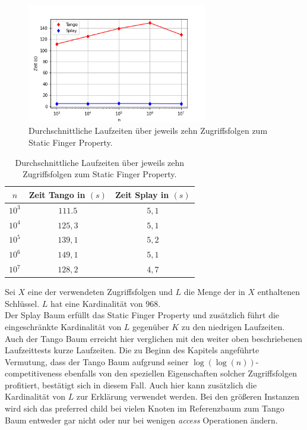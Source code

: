 \documentclass[a4paper,12pt]{article}
\begin{document}
\begin{figure}[H]
	\centering
	\includegraphics[width=0.7\textwidth]{Medien/laufzeittest/diagramm/staticfinger3}
	\caption{Durchschnittliche Laufzeiten über jeweils zehn Zugriffsfolgen zum Static Finger Property.}
\end{figure}
\begin{table}[H]
	\begin{center}
		\begin{tabular}[c]{|c|c|c|}
			\hline
		$n$ & Zeit Tango in $\left(s\right)$ &Zeit Splay in $\left(s\right)$ \\
		\hline
		$10^3$ & $111.5$ &$5,1$ \\
		\hline
		$10^4$  & $125,3$ &$5,1$  \\
		\hline
		$10^5$  & $139,1$ &  $5,2$  \\
		\hline
		$10^6$  & $149,1$ &$5,1$  \\
		\hline
		$10^7$  & $128,2$ &$4,7$  \\
		\hline
		\end{tabular}
		\caption{Durchschnittliche Laufzeiten über jeweils zehn Zugriffsfolgen zum Static Finger Property.} 
	\end{center}
\end{table}
\noindent Sei $X$ eine der verwendeten Zugriffsfolgen und $L$ die Menge der in $X$ enthaltenen Schlüssel. $L$ hat eine Kardinalität von $968$. \\
Der Splay Baum erfüllt das Static Finger Property und zusätzlich führt die eingeschränkte Kardinalität von  $L$ gegenüber $K$ zu den niedrigen Laufzeiten.     
Auch der Tango Baum erreicht hier verglichen mit den weiter oben beschriebenen Laufzeittests kurze Laufzeiten. Die zu Beginn des Kapitels angeführte Vermutung, dass der Tango Baum aufgrund seiner $\log\left(\log\left(n\right)\right)$-competitiveness ebenfalls von den speziellen Eigenschaften solcher Zugriffsfolgen profitiert, bestätigt sich in diesem Fall. Auch hier kann zusätzlich die Kardinalität von $L$ zur Erklärung verwendet werden. Bei den größeren Instanzen wird sich das preferred child bei vielen Knoten im Referenzbaum zum Tango Baum entweder gar nicht oder nur bei wenigen \textit{access} Operationen ändern. \\
\end{document}
